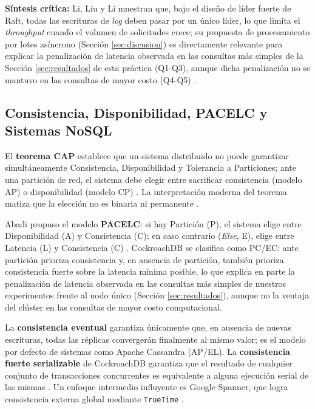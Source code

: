 \documentclass[10pt,letterpaper]{article}
\begin{document}
\textbf{Síntesis crítica:} Li, Liu y Li muestran que, bajo el diseño de líder fuerte de Raft, todas las escrituras de \textit{log} deben pasar por un único líder, lo que limita el \textit{throughput} cuando el volumen de solicitudes crece; su propuesta de procesamiento por lotes asíncrono (Sección \ref{sec:discusion}) es directamente relevante para explicar la penalización de latencia observada en las consultas más simples de la Sección \ref{sec:resultados} de esta práctica (Q1-Q3), aunque dicha penalización no se mantuvo en las consultas de mayor costo (Q4-Q5) \citep{li2022raft}.

\subsection{Consistencia, Disponibilidad, PACELC y Sistemas NoSQL}

El \textbf{teorema CAP} establece que un sistema distribuido no puede garantizar simultáneamente Consistencia, Disponibilidad y Tolerancia a Particiones; ante una partición de red, el sistema debe elegir entre sacrificar consistencia (modelo AP) o disponibilidad (modelo CP) \citep{brewer2012cap}. La interpretación moderna del teorema matiza que la elección no es binaria ni permanente \citep{brewer2012cap}.

Abadi propuso el modelo \textbf{PACELC}: si hay Partición (P), el sistema elige entre Disponibilidad (A) y Consistencia (C); en caso contrario (\textit{Else}, E), elige entre Latencia (L) y Consistencia (C) \citep{abadi2012pacelc}. CockroachDB se clasifica como PC/EC: ante partición prioriza consistencia y, en ausencia de partición, también prioriza consistencia fuerte sobre la latencia mínima posible, lo que explica en parte la penalización de latencia observada en las consultas más simples de nuestros experimentos frente al nodo único (Sección \ref{sec:resultados}), aunque no la ventaja del clúster en las consultas de mayor costo computacional.

La \textbf{consistencia eventual} garantiza únicamente que, en ausencia de nuevas escrituras, todas las réplicas convergerán finalmente al mismo valor; es el modelo por defecto de sistemas como Apache Cassandra (AP/EL). La \textbf{consistencia fuerte serializable} de CockroachDB garantiza que el resultado de cualquier conjunto de transacciones concurrentes es equivalente a alguna ejecución serial de las mismas \citep{taft2020cockroachdb}. Un enfoque intermedio influyente es Google Spanner, que logra consistencia externa global mediante \texttt{TrueTime} \citep{corbett2013spanner,taft2020cockroachdb}.
\end{document}

